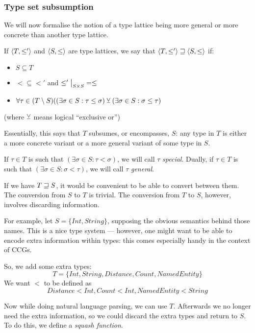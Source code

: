 \documentclass[main.tex]{subfiles}
\begin{document}
\subsubsection{Type set subsumption}
We will now formalise the notion of a type lattice being more general
or more concrete than another type lattice.

\begin{defn}
    If $\langle  T,  \leq'  \rangle$ and $\langle  S,  \leq  \rangle$
    are type lattices, we say that $\langle  T,  \leq'  \rangle \sqsupseteq \langle  S,  \leq  \rangle$ if:
    \begin{itemize}
        \item $S \subseteq T$
        \item $\less \subseteq \less'$ and $\restr{\less'}{S \times S} = \less$
        \item $\forall \tau \in (T \setminus S) ((\exists \sigma \in S : \tau \leq \sigma )
            \veebar (\exists \sigma \in S : \sigma \leq \tau)$
    \end{itemize}
    (where $\veebar$ means logical ``exclusive or'')
\end{defn}

Essentially, this says that $T$ subsumes, or encompasses, $S$: any type in
$T$ is either a more concrete variant or a more general variant of some type in $S$.

If $\tau\in T$ is such that $(\exists \sigma \in S : \tau \less \sigma)$, we will
call $\tau$ \emph{special}. Dually, if $\tau\in T$ is such that
$(\exists \sigma \in S : \sigma \less \tau)$, we will call $\tau$
\emph{general}.

If we have $T \sqsupseteq S$, it would be convenient to be able to convert between them.
The conversion from $S$ to $T$ is trivial. The conversion from $T$ to $S$,
however, involves discarding information.

\begin{example}
    For example, let $S = \{ Int, String \}$, supposing the obvious semantics
    behind those names. This is a nice type system --- however, one might want to
    be able to encode extra information within types: this comes especially
    handy in the context of CCGs.

    So, we add some extra types: \[ T = \{ Int, String, Distance, Count, NamedEntity \} \]
    We want $\less$ to be defined as \[ Distance \less Int, Count \less Int,
    NamedEntity \less String \]

    Now while doing natural language parsing, we can use $T$. Afterwards
    we no longer need the extra information, so we could discard the extra
    types and return to $S$. To do this, we define a \emph{squash function}.
\end{example}
\end{document}

